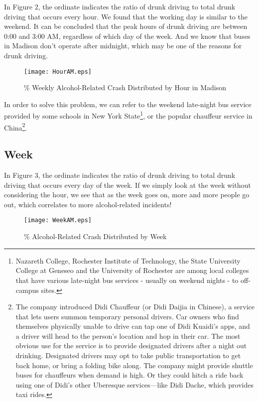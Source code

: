 \documentclass[15pt]{article}
\begin{document}
\newpage
In Figure 2, the ordinate indicates the ratio of drunk driving to total drunk driving that occurs every hour. We found that the working day is similar to the weekend. It can be concluded that the peak hours of drunk driving are between 0:00 and 3:00 AM, regardless of which day of the week. And we know that buses in Madison don't operate after midnight, which may be one of the reasons for drunk driving.
\begin{figure}[H]
\flushleft
\texttt{[image: HourAM.eps]}
\caption{\% Weekly Alcohol-Related Crash Distributed by Hour in Madison}
\label{2}
\end{figure}
In order to solve this problem, we can refer to the weekend late-night bus service provided by some schools in New York State\footnote{Nazareth College, Rochester Institute of Technology, the State University College at Geneseo and the University of Rochester are among local colleges that have various late-night bus services - usually on weekend nights - to off-campus sites.}, or the popular chauffeur service in China\footnote{The company introduced Didi Chauffeur (or Didi Daijia in Chinese), a service that lets users summon temporary personal drivers. Car owners who find themselves physically unable to drive can tap one of Didi Kuaidi's apps, and a driver will head to the person’s location and hop in their car. The most obvious use for the service is to provide designated drivers after a night out drinking. Designated drivers may opt to take public transportation to get back home, or bring a folding bike along. The company might provide shuttle buses for chauffeurs when demand is high. Or they could hitch a ride back using one of Didi’s other Uberesque services—like Didi Dache, which provides taxi rides.}.

\newpage
\subsection{Week}
In Figure 3, the ordinate indicates the ratio of drunk driving to total drunk driving that occurs every day of the week. If we simply look at the week without considering the hour, we see that as the week goes on, more and more people go out, which correlates to more alcohol-related incidents!
\begin{figure}[H]
\flushleft
\texttt{[image: WeekAM.eps]}
\caption{\% Alcohol-Related Crash Distributed by Week}
\end{figure}

\newpage
\end{document}
